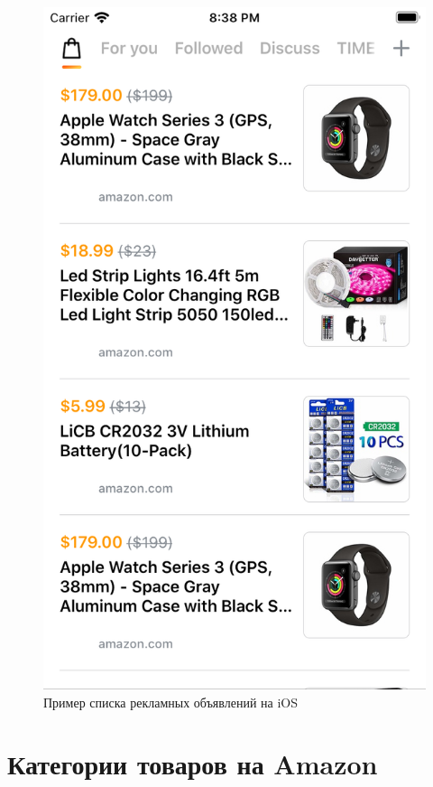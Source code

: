 \documentclass[specification,annotation,times]{itmo-student-thesis}
\begin{document}
\begin{figure}[h]
\caption{Пример списка рекламных объявлений на iOS}
\includegraphics[height=0.35\paperheight]{products-feed-ios}
\centering
\end{figure}

\chapter{Категории товаров на Amazon}\label{sec:app:categories}
\end{document}
